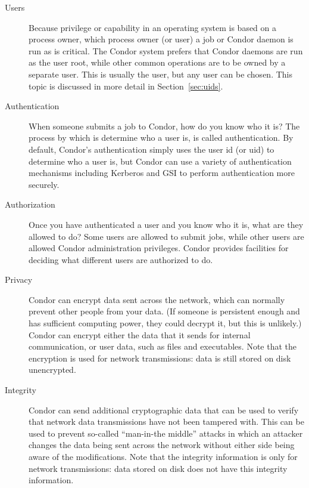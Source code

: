 \begin{description}

\item[Users] Because privilege or capability in an operating system
is based on a process owner,
which process owner (or user) a job or Condor daemon is run
as is critical.
The Condor system 
prefers that Condor daemons are run as the user root,
while other common operations are to be owned by
a separate user.
This is usually the
 user, but any user can be chosen. This topic is discussed
in more detail in Section~\ref{sec:uids}. 

\item[Authentication] When someone submits a job to Condor, how do you
know who it is? The process by which is determine who a user is, is
called authentication. By default, Condor's authentication simply uses
the user id (or uid) to determine who a user is, but Condor can use a
variety of authentication mechanisms including Kerberos and GSI to
perform authentication more securely. 

\item[Authorization] Once you have authenticated a user and you know
who it is, what are they allowed to do? Some users are allowed to
submit jobs, while other users are allowed Condor administration
privileges. Condor provides facilities for deciding what different
users are authorized to do. 

\item[Privacy] Condor can encrypt data sent across the network, which
can normally prevent other people from your data. (If someone is
persistent enough and has sufficient computing power, they could
decrypt it, but this is unlikely.) Condor can encrypt either the data
that it sends for internal communication, or user data, such as files
and executables. Note that the encryption is used for network
transmissions: data is still stored on disk unencrypted.

\item[Integrity] Condor can send additional cryptographic data that
can be used to verify that network data transmissions have not been
tampered with. This can be used to prevent so-called ``man-in-the
middle'' attacks in which an attacker changes the data being sent
across the network without either side being aware of the
modifications. Note that the integrity information is only for network
transmissions: data stored on disk does not have this integrity
information. 

\end{description}

